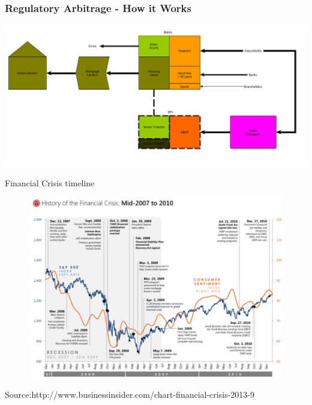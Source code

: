 \documentclass[11pt]{beamer}
\begin{document}
\begin{frame}
  \frametitle{Regulatory Arbitrage - How it Works}
  \begin{center}
    \includegraphics[width=\textwidth]{Figures/Securitization4.png}
  \end{center}
\end{frame}


\begin{frame}
Financial Crisis timeline
\begin{figure}
\includegraphics[width=1\textwidth]{Figures/GFC1.png}
\end{figure}
\tiny{Source:http://www.businessinsider.com/chart-financial-crisis-2013-9}
\end{frame}

\begin{frame}
\begin{center}
\end{center}
\end{frame}
\end{document}
